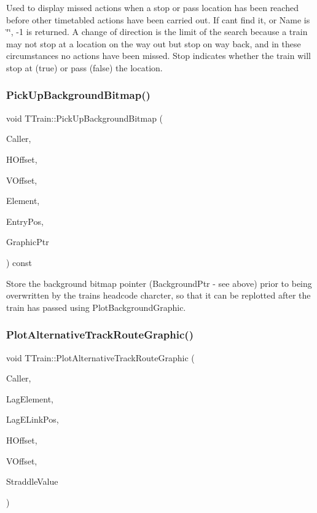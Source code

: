 Used to display missed actions when a stop or pass location has been reached before other timetabled actions have been carried out. If can\textquotesingle{}t find it, or Name is \char`\"{}\char`\"{}, -\/1 is returned. A change of direction is the limit of the search because a train may not stop at a location on the way out but stop on way back, and in these circumstances no actions have been missed. Stop indicates whether the train will stop at (true) or pass (false) the location. \mbox{\label{class_t_train_af92ae73f1be23475e7ae424306cd4866}} 
\subsubsection{\texorpdfstring{Pick\+Up\+Background\+Bitmap()}{PickUpBackgroundBitmap()}}
{\footnotesize\ttfamily void T\+Train\+::\+Pick\+Up\+Background\+Bitmap (\begin{DoxyParamCaption}\item[{int}]{Caller,  }\item[{int}]{H\+Offset,  }\item[{int}]{V\+Offset,  }\item[{int}]{Element,  }\item[{int}]{Entry\+Pos,  }\item[{Graphics\+::\+T\+Bitmap $\ast$}]{Graphic\+Ptr }\end{DoxyParamCaption}) const\hspace{0.3cm}{\ttfamily [private]}}

Store the background bitmap pointer (Background\+Ptr -\/ see above) prior to being overwritten by the train\textquotesingle{}s headcode charcter, so that it can be replotted after the train has passed using Plot\+Background\+Graphic. \mbox{\label{class_t_train_aa21e18b3085773ca8351c446911611c1}} 
\subsubsection{\texorpdfstring{Plot\+Alternative\+Track\+Route\+Graphic()}{PlotAlternativeTrackRouteGraphic()}}
{\footnotesize\ttfamily void T\+Train\+::\+Plot\+Alternative\+Track\+Route\+Graphic (\begin{DoxyParamCaption}\item[{int}]{Caller,  }\item[{unsigned int}]{Lag\+Element,  }\item[{int}]{Lag\+E\+Link\+Pos,  }\item[{int}]{H\+Offset,  }\item[{int}]{V\+Offset,  }\item[{T\+Straddle}]{Straddle\+Value }\end{DoxyParamCaption})\hspace{0.3cm}{\ttfamily [private]}}


